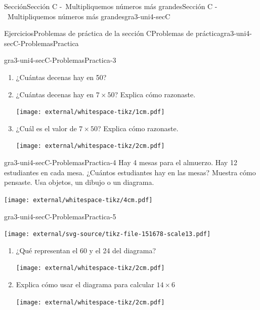 \begin{sectionptx}{Sección}{Sección C -~Multipliquemos números más grandes}{}{Sección C -~Multipliquemos números más grandes}{}{}{gra3-uni4-secC}
\begin{exercises-subsection}{Ejercicios}{Problemas de práctica de la sección C}{}{Problemas de práctica}{}{}{gra3-uni4-secC-ProblemasPractica}
\begin{divisionexercise}{1}{}{}{gra3-uni4-secC-ProblemasPractica-3}%
%
\vspace{-1.4\baselineskip}
\begin{enumerate}[label={(\alph*)}]
\item{}¿Cuántas decenas hay en 50?%
\item{}¿Cuántas decenas hay en \(7 \times 50\)? Explica cómo razonaste.%
\begin{image}{0}{1}{0}{}%
\texttt{[image: external/whitespace-tikz/1cm.pdf]}
\end{image}%
\item{}¿Cuál es el valor de \(7 \times 50\)? Explica cómo razonaste.%
\begin{image}{0}{1}{0}{}%
\texttt{[image: external/whitespace-tikz/2cm.pdf]}
\end{image}%
\end{enumerate}
\end{divisionexercise}%
\begin{divisionexercise}{2}{}{}{gra3-uni4-secC-ProblemasPractica-4}%
Hay 4 mesas para el almuerzo. Hay 12 estudiantes en cada mesa. ¿Cuántos estudiantes hay en las mesas? Muestra cómo pensaste. Usa objetos, un dibujo o un diagrama.%
\begin{image}{0}{1}{0}{}%
\texttt{[image: external/whitespace-tikz/4cm.pdf]}
\end{image}%
\end{divisionexercise}%
\begin{divisionexercise}{3}{}{}{gra3-uni4-secC-ProblemasPractica-5}%
\vspace{-1.4\baselineskip}
\begin{sidebyside}{2}{0.0125}{0.0125}{0.025}%
\begin{sbspanel}{0.4}%
\texttt{[image: external/svg-source/tikz-file-151678-scale13.pdf]}
\end{sbspanel}%
\begin{sbspanel}{0.6}%
%
\begin{enumerate}[label={(\alph*)}]
\item{}¿Qué representan el 60 y el 24 del diagrama?%
\par
\texttt{[image: external/whitespace-tikz/2cm.pdf]}
\item{}Explica cómo usar el diagrama para calcular \(14 \times 6\)%
\par
\texttt{[image: external/whitespace-tikz/2cm.pdf]}
\end{enumerate}
\end{sbspanel}%

\end{sidebyside}
\end{divisionexercise}
\end{exercises-subsection}
\end{sectionptx}
